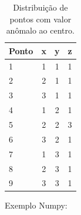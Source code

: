             
            \begin{table}[H]
                
                \caption{Distribuição de pontos com valor anômalo ao centro.}
                \label{pontos_ex_inter}
                \begin{center}
                    \centering
                    \begin{tabular}{l|ccc}
                        \hline
                        {\bf Ponto} & {\bf x} & {\bf y} & {\bf z}\\
                        \hline
                        1&1       &   1     &  1     \\
                        2&2       &   1     &  1     \\
                        3&3       &   1     &  1     \\
                        4&1       &   2     &  1     \\
                        5&2       &   2     &  3     \\
                        6&3       &   2     &  1     \\
                        7&1       &   3     &  1     \\
                        8&2       &   3     &  1     \\
                        9&3       &   3     &  1     \\
                        \hline
                    \end{tabular}
                \end{center}
            \end{table}
            
            Exemplo Numpy:
            \begin{quote}
                                                         
            \end{quote}
            
